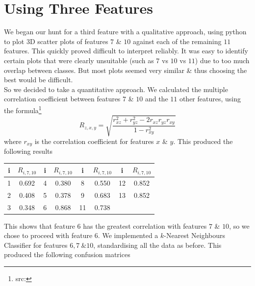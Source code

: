 \documentclass[11pt,a4paper]{article}
\begin{document}
\section{Using Three Features}
We began our hunt for a third feature with a qualitative approach, using python to plot 3D scatter plots of features $7$ \& $10$ against each of the remaining $11$ features. This quickly proved difficult to interpret reliably. It was easy to identify certain plots that were clearly unsuitable (such as $7$ vs $10$ vs $11$) due to too much overlap between classes. But most plots seemed very similar \& thus choosing the best would be difficult.\\
\indent So we decided to take a quantitative approach. We calculated the multiple correlation coefficient between features $7$ \& $10$ and the $11$ other features, using the formula\footnote{src: {}}
$$R_{z,x,y}=\sqrt{\frac{r_{xz}^2+r_{yz}^2-2r_{xz}r_{yz}r_{xy}}{1-r_{xy}^2}}$$
where $r_{xy}$ is the correlation coefficient for features $x$ \& $y$. This produced the following results
\begin{center}
\begin{tabular}{|c|c|c|c|c|c|c|c|}
\hline i&$R_{i,7,10}$&i&$R_{i,7,10}$&i&$R_{i,7,10}$&i&$R_{i,7,10}$\\
\hline 1&0.692&4&0.380&8&0.550&12&0.852\\
2&0.408&5&0.378&9&0.683&13&0.852\\\cline{7-8}
3&0.348&6&0.868&11&0.738\\\cline{1-6}
\end{tabular}
\end{center}
This shows that feature $6$ has the greatest correlation with features $7$ \& $10$, so we chose to proceed with feature $6$. We implemented a $k$-Nearest Neighbours Classifier for features $6,7\ \& 10$, standardising all the data as before. This produced the following confusion matrices
\end{document}
